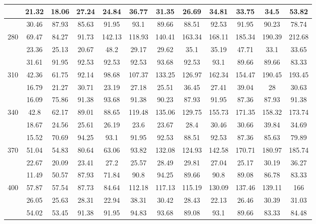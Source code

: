 \documentclass[10pt]{article}
\begin{document}
\begin{center}
\begin{tabular}{|c|c|c|c|c|c|c|c|c|c|c|c|}
\hline
 & 21.32 & 18.06 & 27.24 & 24.84 & 36.77 & 31.35 & 26.69 & 34.81 & 33.75 & 34.5 & 53.82 \\
\hline
 & 30.46 & 87.93 & 85.63 & 91.95 & 93.1 & 89.66 & 88.51 & 92.53 & 91.95 & 90.23 & 78.74 \\
\hline
\multirow{3}{*}{280} & 69.47 & 84.27 & 91.73 & 142.13 & 118.93 & 140.41 & 163.34 & 168.11 & 185.34 & 190.39 & 212.68 \\
\hline
 & 23.36 & 25.13 & 20.67 & 48.2 & 29.17 & 29.62 & 35.1 & 35.19 & 47.71 & 33.1 & 33.65 \\
\hline
 & 31.61 & 91.95 & 92.53 & 92.53 & 92.53 & 93.68 & 92.53 & 93.1 & 89.66 & 89.66 & 83.33 \\
\hline
\multirow{3}{*}{310} & 42.36 & 61.75 & 92.14 & 98.68 & 107.37 & 133.25 & 126.97 & 162.34 & 154.47 & 190.45 & 193.45 \\
\hline
 & 16.79 & 21.27 & 30.71 & 23.19 & 27.18 & 25.51 & 36.45 & 27.41 & 39.04 & 28 & 30.63 \\
\hline
 & 16.09 & 75.86 & 91.38 & 93.68 & 91.38 & 90.23 & 87.93 & 91.95 & 87.36 & 87.93 & 91.38 \\
\hline
\multirow{3}{*}{340} & 42.8 & 62.17 & 89.01 & 88.65 & 119.48 & 135.06 & 129.75 & 155.73 & 171.35 & 158.32 & 173.74 \\
\hline
 & 18.67 & 24.56 & 25.61 & 26.19 & 23.6 & 23.67 & 28.4 & 30.46 & 30.66 & 39.84 & 34.69 \\
\hline
 & 15.52 & 70.69 & 94.25 & 93.1 & 91.95 & 92.53 & 88.51 & 92.53 & 87.36 & 85.63 & 79.89 \\
\hline
\multirow{3}{*}{370} & 51.04 & 54.83 & 80.64 & 63.06 & 93.82 & 132.08 & 124.93 & 142.58 & 170.71 & 180.97 & 185.74 \\
\hline
 & 22.67 & 20.09 & 23.41 & 27.2 & 25.57 & 28.49 & 29.81 & 27.04 & 25.17 & 30.19 & 36.27 \\
\hline
 & 11.49 & 50.57 & 87.93 & 71.84 & 90.8 & 94.25 & 89.66 & 90.8 & 89.08 & 86.78 & 83.33 \\
\hline
\multirow{3}{*}{400} & 57.87 & 57.54 & 87.73 & 84.64 & 112.18 & 117.13 & 115.19 & 130.09 & 137.46 & 139.11 & 166 \\
\hline
 & 26.05 & 25.63 & 28.31 & 22.94 & 38.31 & 30.42 & 28.43 & 22.13 & 26.46 & 30.39 & 31.03 \\
\hline
 & 54.02 & 53.45 & 91.38 & 91.95 & 94.83 & 93.68 & 89.08 & 93.1 & 89.66 & 83.33 & 84.48 \\
\hline
\end{tabular}
\end{center}
\end{document}
